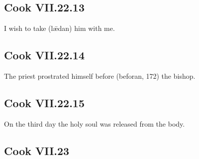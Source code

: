 \par\begin{minipage}{\linewidth}\raggedright
\subsection*{Cook VII.22.13}

I wish to take (lǣdan) him with me.

\end{minipage}\par\addvspace{4pt}

\par\begin{minipage}{\linewidth}\raggedright
\subsection*{Cook VII.22.14}

The priest prostrated himself before (beforan, 172) the bishop.

\end{minipage}\par\addvspace{4pt}

\par\begin{minipage}{\linewidth}\raggedright
\subsection*{Cook VII.22.15}

On the third day the holy soul was released from the body.

\end{minipage}\par\addvspace{4pt}

\subsection*{Cook VII.23}


